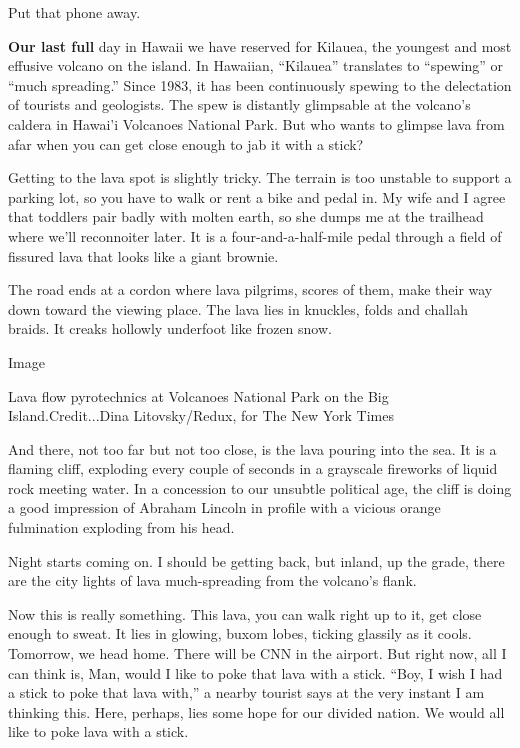 Put that phone away.

\textbf{Our last full} day in Hawaii we have reserved for Kilauea, the
youngest and most effusive volcano on the island. In Hawaiian,
``Kilauea'' translates to ``spewing'' or ``much spreading.'' Since 1983,
it has been continuously spewing to the delectation of tourists and
geologists. The spew is distantly glimpsable at the volcano's caldera in
Hawai'i Volcanoes National Park. But who wants to glimpse lava from afar
when you can get close enough to jab it with a stick?

Getting to the lava spot is slightly tricky. The terrain is too unstable
to support a parking lot, so you have to walk or rent a bike and pedal
in. My wife and I agree that toddlers pair badly with molten earth, so
she dumps me at the trailhead where we'll reconnoiter later. It is a
four-and-a-half-mile pedal through a field of fissured lava that looks
like a giant brownie.

The road ends at a cordon where lava pilgrims, scores of them, make
their way down toward the viewing place. The lava lies in knuckles,
folds and challah braids. It creaks hollowly underfoot like frozen snow.

Image

Lava flow pyrotechnics at Volcanoes National Park on the Big
Island.Credit...Dina Litovsky/Redux, for The New York Times

And there, not too far but not too close, is the lava pouring into the
sea. It is a flaming cliff, exploding every couple of seconds in a
grayscale fireworks of liquid rock meeting water. In a concession to our
unsubtle political age, the cliff is doing a good impression of Abraham
Lincoln in profile with a vicious orange fulmination exploding from his
head.

Night starts coming on. I should be getting back, but inland, up the
grade, there are the city lights of lava much-spreading from the
volcano's flank.

Now this is really something. This lava, you can walk right up to it,
get close enough to sweat. It lies in glowing, buxom lobes, ticking
glassily as it cools. Tomorrow, we head home. There will be CNN in the
airport. But right now, all I can think is, Man, would I like to poke
that lava with a stick. ``Boy, I wish I had a stick to poke that lava
with,'' a nearby tourist says at the very instant I am thinking this.
Here, perhaps, lies some hope for our divided nation. We would all like
to poke lava with a stick.

